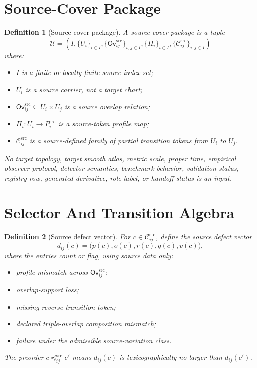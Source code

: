 \documentclass[11pt]{article}
\newcommand{\Ovsrc}{\mathsf{Ov}^{\mathrm{src}}}
\newcommand{\Cand}{\mathcal{C}^{\mathrm{src}}}
\newtheorem{definition}{Definition}
\begin{document}
\section{Source-Cover Package}

\begin{definition}[Source-cover package]
A source-cover package is a tuple
\[
  \mathcal U =
  \left(I,\{U_i\}_{i\in I},\{\Ovsrc_{ij}\}_{i,j\in I},
  \{\Pi_i\}_{i\in I},\{\Cand_{ij}\}_{i,j\in I}\right)
\]
where:
\begin{itemize}
  \item \(I\) is a finite or locally finite source index set;
  \item \(U_i\) is a source carrier, not a target chart;
  \item \(\Ovsrc_{ij}\subseteq U_i\times U_j\) is a source overlap relation;
  \item \(\Pi_i:U_i\to P_i^{\mathrm{src}}\) is a source-token profile map;
  \item \(\Cand_{ij}\) is a source-defined family of partial transition
  tokens from \(U_i\) to \(U_j\).
\end{itemize}
No target topology, target smooth atlas, metric scale, proper time, empirical
observer protocol, detector semantics, benchmark behavior, validation status,
registry row, generated derivative, role label, or handoff status is an input.
\end{definition}

\section{Selector And Transition Algebra}

\begin{definition}[Source defect vector]
For \(c\in\Cand_{ij}\), define the source defect vector
\[
  d_{ij}(c)=
  \bigl(p(c),o(c),r(c),q(c),v(c)\bigr),
\]
where the entries count or flag, using source data only:
\begin{itemize}
  \item profile mismatch across \(\Ovsrc_{ij}\);
  \item overlap-support loss;
  \item missing reverse transition token;
  \item declared triple-overlap composition mismatch;
  \item failure under the admissible source-variation class.
\end{itemize}
The preorder \(c\preceq_{ij}^{\mathrm{src}}c'\) means
\(d_{ij}(c)\) is lexicographically no larger than \(d_{ij}(c')\).
\end{definition}
\end{document}
